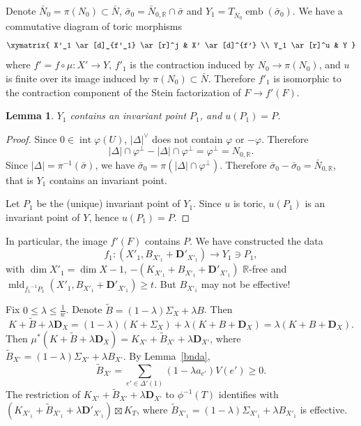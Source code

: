 \documentclass[12pt,twoside]{amsart}
\newcommand{\R}{{\mathbb R}}
\newcommand{\bD}{{\mathbf D}}
\newcommand{\emb}{\operatorname{emb}}
\newcommand{\Int}{\operatorname{int}}
\newcommand{\mld}{\operatorname{mld}}
\theoremstyle{plain}
\newtheorem{lem}[thm]{Lemma}
\theoremstyle{definition}
\theoremstyle{remark}
\begin{document}
Denote $\bar{N}_0=\pi(N_0)\subset \bar{N}$, $\bar{\sigma}_0=\bar{N}_{0,\R}\cap \bar{\sigma}$
and $Y_1=T_{\bar{N}_0}\emb(\bar{\sigma}_0)$. We have a commutative diagram of toric morphisms
\[ \xymatrix{
	X'_1  \ar[d]_{f'_1}   \ar[r]^j   &   X'  \ar[d]^{f'}  \\
	Y_1 \ar[r]^u   & Y
} \]
where $f'=f\circ \mu\colon X'\to Y$, $f'_1$ is the contraction induced by $N_0\to \pi(N_0)$, 
and $u$ is finite over its image induced by $\pi(N_0)\subset \bar{N}$. Therefore 
$f'_1$ is isomorphic to the contraction component of the Stein factorization of 
$F\to f'(F)$. 

\begin{lem}
	$Y_1$ contains an invariant point $P_1$, and $u(P_1)=P$.
\end{lem}

\begin{proof}
	Since $0\in \Int \varphi(U)$, $|\Delta|^\vee$ does not contain $\varphi$ or $-\varphi$.
	Therefore 
	$$
	|\Delta|\cap\varphi^\perp-|\Delta|\cap \varphi^\perp=\varphi^\perp=N_{0,\R}.
	$$
	Since $|\Delta|=\pi^{-1}(\bar{\sigma})$, we have $\bar{\sigma}_0=\pi(|\Delta|\cap \varphi^\perp)$.
	Therefore $\bar{\sigma}_0-\bar{\sigma}_0=\bar{N}_{0,\R}$, that is $Y_1$ contains an invariant point.
	
	Let $P_1$ be the (unique) invariant point of $Y_1$. Since $u$ is toric, $u(P_1)$ is 
	an invariant point of $Y$, hence $u(P_1)=P$.
\end{proof} 

In particular, the image $f'(F)$ contains $P$. We have constructed the data 
$$
f_1\colon (X'_1,B_{X'_1}+\bD'_{X'_1})\to Y_1\ni P_1,
$$ 
with $\dim X'_1=\dim X-1$, 
$-(K_{X'_1}+B_{X'_1}+\bD'_{X'_1})$ $\R$-free and $\mld_{{f_1}^{-1}P_1}(X'_1,B_{X'_1}+\bD'_{X'_1})\ge t$.
But $B_{X'_1}$ may not be effective!

Fix $0\le \lambda \le \frac{1}{w}$. Denote $\tilde{B}=(1-\lambda)\Sigma_X+\lambda B$.
Then 
$$
K+\tilde{B}+\lambda \bD_X =(1-\lambda)(K+\Sigma_X)+\lambda (K+B+\bD_X)=\lambda(K+B+\bD_X).
$$
Then $\mu^*(K+\tilde{B}+\lambda \bD_X)=K_{X'}+\tilde{B}_{X'}+\lambda \bD_{X'}$, where 
$\tilde{B}_{X'}=(1-\lambda)\Sigma_{X'}+\lambda B_{X'}$. By Lemma~\ref{bnda},
$$
\tilde{B}_{X'}=\sum_{e'\in \Delta'(1)}(1-\lambda a_{e'})V(e')\ge 0.
$$
The restriction of $K_{X'}+\tilde{B}_{X'}+\lambda \bD_{X'}$ to $\phi^{-1}(T)$ identifies with
$(K_{X'_1}+\tilde{B}_{X'_1}+\lambda \bD'_{X'_1})\boxtimes K_T$, where 
$\tilde{B}_{X'_1}=(1-\lambda)\Sigma_{X'_1}+\lambda B_{X'_1}$ is effective.
\end{document}
